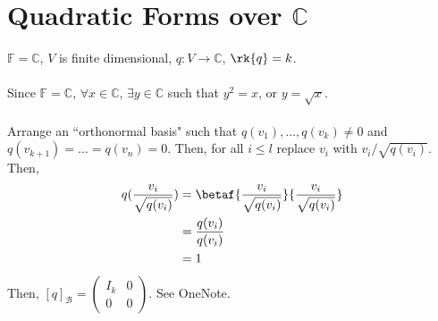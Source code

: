 \documentclass[letterpaper,12pt]{article}
\theoremstyle{definition}
\begin{document}
\section*{Quadratic Forms over $\mathbb{C}$}
$\mathbb{F} = \mathbb{C}$, $V$ is finite dimensional, $q: V \rightarrow \mathbb{C}$, $\rk{q} = k$.
\\ \\ Since $\mathbb{F} = \mathbb{C}$, $\forall x \in \mathbb{C}$, $\exists y \in \mathbb{C}$ such that $y^2 = x$, or $y = \sqrt{x}$.
\\ \\ Arrange an ``orthonormal basis" such that $q(v_1), \dots, q(v_k) \neq 0$ and $q(v_{k+1}) = \dots = q(v_n) = 0$. Then, for all $i \leq l$ replace $v_i$ with $v_i / \sqrt{q(v_i)}$. Then,
\begin{align*}
    q(\dfrac{v_i}{\sqrt{q(v_i)}}) & = \betaf{\dfrac{v_i}{\sqrt{q(v_i)}}}{\dfrac{v_i}{\sqrt{q(v_i)}}} \\
    & = \dfrac{q(v_i)}{q(v_i)} \\
    & = 1
\end{align*}
Then, $[q]_{\mathcal{B}} = \begin{pmatrix} I_k & 0 \\ 0 & 0 \end{pmatrix}$. See OneNote.
\end{document}
